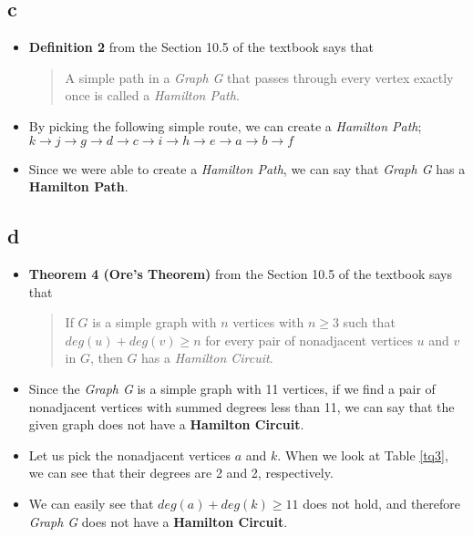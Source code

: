 \documentclass[11pt]{article}
\begin{document}
\subsection*{c}

\begin{itemize}
    \item  \textbf{Definition 2} from the Section 10.5 of the textbook says that 
    \begin{quote}
        A simple path in a \textit{Graph G} that passes through every vertex exactly once is called a \textit{Hamilton Path}.
    \end{quote}
    
    \item By picking the following simple route, we can create a \textit{Hamilton Path};
    \subitem $ k \rightarrow j \rightarrow g \rightarrow d \rightarrow c \rightarrow i \rightarrow h \rightarrow e \rightarrow a \rightarrow b \rightarrow f $
    \item Since we  were able to create a \textit{Hamilton Path}, we can say that \textit{Graph G} has a \textbf{Hamilton Path}. 
\end{itemize}

\subsection*{d}
\begin{itemize}
    \item  \textbf{Theorem 4 (Ore's Theorem)} from the Section 10.5 of the textbook says that 
    \begin{quote}
        If $G$ is a simple graph with $n$ vertices with $n \geq 3$ such that
$deg(u) + deg(v) \geq n$ for every pair of nonadjacent vertices $u$ and $v$ in $G$, then $G$ has a \textit{Hamilton Circuit}.
    \end{quote}
    \item Since the \textit{Graph G} is a simple graph with 11 vertices, if we find a pair of nonadjacent vertices with summed degrees less than 11, we can say that the given graph does not have a \textbf{Hamilton Circuit}. 
    \item Let us pick the nonadjacent vertices $a$ and $k$. When we look at Table \ref{tq3}, we can see that their degrees are 2 and 2, respectively. 
    \item We can easily see that $deg(a) + deg(k) \geq 11$ does not hold, and therefore  \textit{Graph G} does not have a \textbf{Hamilton Circuit}. 
\end{itemize}
\end{document}
